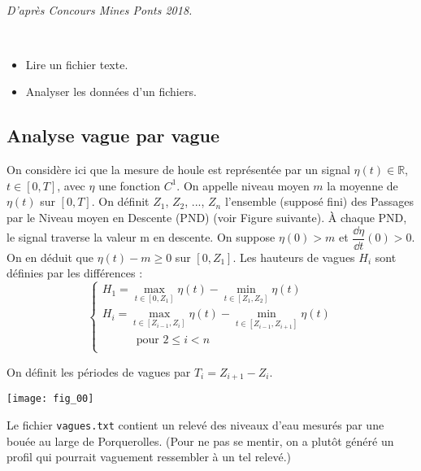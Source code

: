 \setcounter{numques}{0}~\\


\begin{flushright}
\textit{D'après Concours Mines Ponts 2018.}
\end{flushright}
\begin{obj} ~\\
\begin{itemize}
\item Lire un fichier texte.
\item Analyser les données d'un fichiers. 
\end{itemize}
\end{obj}

\subsection*{Analyse vague par vague}

On considère ici que la mesure de houle est représentée par un signal $\eta(t) \in \mathbb{R}$, $t\in[0,T]$, avec
$\eta$ une fonction $C^1$.
On appelle niveau moyen $m$ la moyenne de $\eta(t)$ sur $[0, T]$.
On définit $Z_1$, $Z_2$, ..., $Z_n$ l’ensemble (supposé fini) des Passages par le Niveau moyen en Descente
(PND) (voir Figure suivante). À chaque PND, le signal traverse la valeur m en descente.
On suppose $\eta(0)>m$ et $\dfrac{\dd \eta }{\dd t}(0)>0$. On en déduit que $\eta(t)-m\geq 0$ sur $\left[0, Z_1\right]$.
Les hauteurs de vagues $H_i$ sont définies par les différences :
$$
 \left\{ 
\begin{array}{l}
H_1 = \max_{t\in[0,Z_1]} \eta(t)-\min_{t\in[Z_1,Z_2]} \eta(t) \\
H_i = \max_{t\in[Z_{i-1},Z_i]} \eta(t)-\min_{t\in[Z_{i-1},Z_{i+1}]} \eta(t) \\
\quad \quad \quad \text{pour }2\leq i <  n\\
\end{array}
\right.
$$

On définit les périodes de vagues par $T_i = Z_{i+1}-Z_i$.

\begin{center}
\texttt{[image: fig\_00]}
\end{center}

Le fichier \texttt{vagues.txt} contient un relevé des niveaux d'eau mesurés par une bouée au large de Porquerolles. (Pour ne pas se mentir, on a plutôt généré un profil qui pourrait vaguement ressembler à un tel relevé.)

